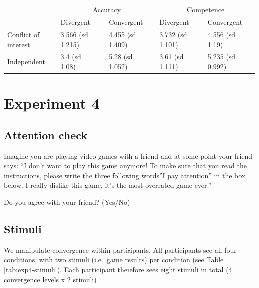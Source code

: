 \documentclass[
  doc,floatsintext]{apa6}
\begin{document}
\begin{table}

\caption{\label{tab:exp3-table}}
\centering
\begin{tabular}[t]{lllll}
\toprule
\multicolumn{1}{c}{} & \multicolumn{2}{c}{Accuracy} & \multicolumn{2}{c}{Competence} \\
\cmidrule(l{3pt}r{3pt}){2-3} \cmidrule(l{3pt}r{3pt}){4-5}
  & Divergent & Convergent & Divergent & Convergent\\
\midrule
Conflict of interest & 3.566 (sd = 1.215) & 4.455 (sd = 1.409) & 3.732 (sd = 1.101) & 4.556 (sd = 1.19)\\
Independent & 3.4 (sd = 1.08) & 5.28 (sd = 1.052) & 3.61 (sd = 1.111) & 5.235 (sd = 0.992)\\
\bottomrule
\end{tabular}
\end{table}

\clearpage

\section{Experiment 4}\label{exp4}

\FloatBarrier

\subsection{Attention check}\label{attention-check-3}

Imagine you are playing video games with a friend and at some point your friend says: ``I don't want to play this game anymore! To make sure that you read the instructions, please write the three following words''I pay attention'' in the box below. I really dislike this game, it's the most overrated game ever.''

Do you agree with your friend? (Yes/No)

\subsection{Stimuli}\label{stimuli-2}

We manipulate convergence within participants. All participants see all four conditions, with two stimuli (i.e.~game results) per condition (see Table \ref{tab:exp4-stimuli}). Each participant therefore sees eight stimuli in total (4 convergence levels x 2 stimuli)
\end{document}
